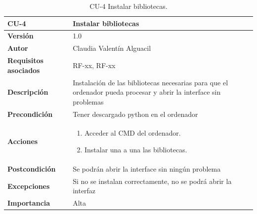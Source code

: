\begin{table}[p]
	\centering
	\begin{tabularx}{\linewidth}{ p{} p{} }
		\toprule
		\textbf{CU-4} & \textbf{Instalar bibliotecas}\\
		\toprule
		\textbf{Versión}              & 1.0    \\
		\textbf{Autor}                & Claudia Valentín Alguacil \\
		\textbf{Requisitos asociados} & RF-xx, RF-xx \\
		\textbf{Descripción}          & Instalación de las bibliotecas necesarias para que el ordenador pueda procesar y abrir la interface sin problemas\\
		\textbf{Precondición}         & Tener descargado python en el ordenador \\
		\textbf{Acciones}             &
		\begin{enumerate}
			\def\labelenumi{\arabic{enumi}.}
			\tightlist
			\item Acceder al CMD del ordenador.
			\item Instalar una a una las bibliotecas.
		\end{enumerate}\\
		\textbf{Postcondición}        &  Se podrán abrir la interface sin ningún problema \\
		\textbf{Excepciones}          & Si no se instalan correctamente, no se podrá abrir la interfaz \\
		\textbf{Importancia}          & Alta \\
		\bottomrule
	\end{tabularx}
	\caption{CU-4 Instalar bibliotecas.}
\end{table}

